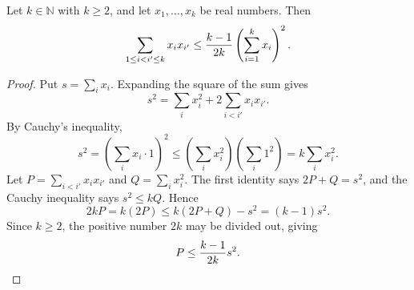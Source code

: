 \begin{helper}
Let $k\in\mathbb N$ with $k\ge2$, and let $x_1,\ldots,x_k$ be real
numbers.  Then
\[
\sum_{1\le i<i'\le k}x_ix_{i'}
\le {k-1\over 2k}\left(\sum_{i=1}^k x_i\right)^2 .
\]
\end{helper}
\begin{proof}
Put $s=\sum_i x_i$.  Expanding the square of the sum gives
\[
s^2=\sum_i x_i^2+2\sum_{i<i'}x_ix_{i'} .
\]
By Cauchy's inequality,
\[
s^2=\left(\sum_i x_i\cdot 1\right)^2
\le \left(\sum_i x_i^2\right)\left(\sum_i 1^2\right)
=k\sum_i x_i^2 .
\]
Let $P=\sum_{i<i'}x_ix_{i'}$ and $Q=\sum_i x_i^2$.  The first identity says
$2P+Q=s^2$, and the Cauchy inequality says $s^2\le kQ$.  Hence
\[
2kP=k(2P)\le k(2P+Q)-s^2=(k-1)s^2 .
\]
Since $k\ge2$, the positive number $2k$ may be divided out, giving
\[
P\le {k-1\over 2k}s^2 .
\]
\end{proof}
